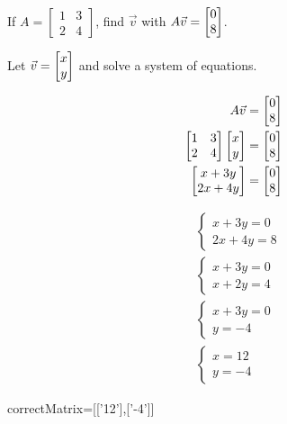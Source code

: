 \documentclass{ximera}
\begin{document}
\begin{question}
  If $A = \begin{bmatrix} 1 &3\\2&4\end{bmatrix} $, find $\vec{v}$ with $A\vec{v} = \begin{bmatrix}0\\8\end{bmatrix}$.
  \begin{solution}
  \begin{hint}
  	Let $\vec{v} = \begin{bmatrix}x\\y\end{bmatrix}$ and solve a system of equations.
  \end{hint}
  \begin{hint}
  	\begin{align*}
  		A\vec{v} &= \begin{bmatrix}0\\8\end{bmatrix}\\
  		\begin{bmatrix} 1 &3\\2&4\end{bmatrix}\begin{bmatrix}x\\y\end{bmatrix} &= \begin{bmatrix}0\\8\end{bmatrix}\\
  		\begin{bmatrix}x+3y\\2x+4y\end{bmatrix} &= \begin{bmatrix}0\\8\end{bmatrix}
  	\end{align*}
  \end{hint}
  \begin{hint}
	\begin{align*}
    &\begin{cases}
  			x+3y = 0\\
  			2x+4y=8
  		\end{cases}
  		\\
  		&\begin{cases}
  			x+3y = 0\\
  			x+2y=4
  		\end{cases}
  		\\
  		&\begin{cases}
  			x+3y = 0\\
  			y=-4
  		\end{cases}
  		\\
  		&\begin{cases}
  			x=12\\
  			y=-4
  		\end{cases}
\end{align*}
 \end{hint}
  	\begin{matrix-answer}[name=v]
  		correctMatrix=[['12'],['-4']]
  	\end{matrix-answer}
  \end{solution}
\end{question}
	
\end{document}
